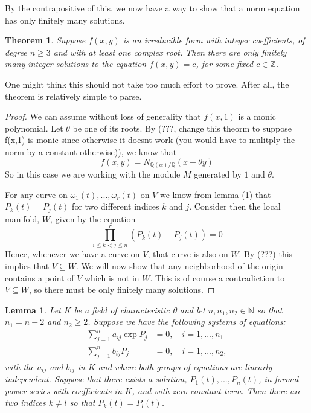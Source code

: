 \documentclass{article}
\newtheorem{theorem}{Theorem}[section]
\newtheorem{lemma}{Lemma}[section]
\newcommand{\mbb}[1]{\mathbb{#1}}
\begin{document}
By the contrapositive of this, we now have a way to show that a norm equation has only finitely many solutions. 



\begin{theorem}
    Suppose $f(x,y)$ is an irreducible form with integer coefficients, of degree $n \geq 3$ and with at least one complex root. Then there are only finitely many integer solutions to the equation $f(x,y) = c$, for some fixed $c \in \mbb{Z}$.
\end{theorem}
One might think this should not take too much effort to prove. After all, the theorem is relatively simple to parse.

\begin{proof}
    We can assume without loss of generality that $f(x, 1)$ is a monic polynomial. Let $\theta$ be one of its roots. By (???, change this theorm to suppose f(x,1) is monic since otherwise it doesnt work (you would have to mulitply the norm by a constant otherwise)), we know that 
    $$f(x,y) = N_{\mbb{Q}(\alpha)/\mbb{Q}}(x + \theta y)$$
    So in this case we are working with the module $M$ generated by $1$ and $\theta$. 



    For any curve on $\omega_1(t), ..., \omega_r(t)$ on $V$ we know from lemma (\ref{lem: Two power series are equal}) that $P_k(t) = P_j(t)$ for two different indices $k$ and $j$. Consider then the local manifold, $W$, given by the equation
    $$\prod_{i \leq k < j \leq n}^r (P_k(t) - P_j(t)) = 0$$
    Hence, whenever we have a curve on $V$, that curve is also on $W$. By (???) this implies that $V \subseteq W$. We will now show that any neighborhood of the origin contains a point of $V$ which is not in $W$. This is of course a contradiction to $V \subseteq W$, so there must be only finitely many solutions. 
    
    
\end{proof}


\begin{lemma} \label{lem: Two power series are equal}
    Let $K$ be a field of characteristic 0 and let $n,n_1,n_2 \in \mbb N$ so that $n_1 = n -2$ and $n_2 \geq 2$. Suppose we have the following systems of equations:
    \begin{align*}
        \sum_{j = 1}^n a_{ij} \exp P_j &= 0, \quad i = 1, ..., n_1 \\
        \sum_{j = 1}^n b_{ij} P_j &= 0, \quad i = 1, ..., n_2,
    \end{align*}
    with the $a_{ij}$ and $b_{ij}$ in $K$ and where both groups of equations are linearly independent. Suppose that there exists a solution, $P_1(t), ..., P_n(t)$, in formal power series with coefficients in $K$, and with zero constant term. Then there are two indices $k \neq l$ so that $P_k(t) = P_l(t)$.
\end{lemma}
\end{document}

